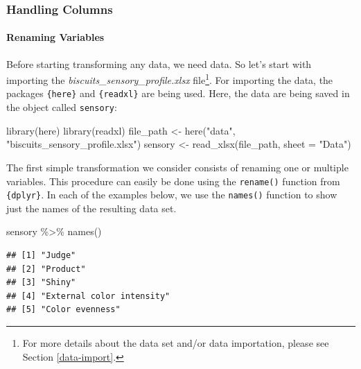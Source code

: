 \documentclass[
]{krantz}
\makeatletter
\newenvironment{Shaded}{\begin{snugshade}}{\end{snugshade}}
\newcommand{\AttributeTok}[1]{\textcolor[rgb]{0.61,0.61,0.61}{#1}}
\newcommand{\FunctionTok}[1]{\textcolor[rgb]{0,0,0}{#1}}
\newcommand{\NormalTok}[1]{#1}
\newcommand{\OtherTok}[1]{\textcolor[rgb]{0.37,0.37,0.37}{#1}}
\newcommand{\SpecialCharTok}[1]{\textcolor[rgb]{0,0,0}{#1}}
\newcommand{\StringTok}[1]{\textcolor[rgb]{0.5,0.5,0.5}{#1}}
\newenvironment{kframe}{%
\medskip{}
\setlength{\fboxsep}{.8em}
 \def\at@end@of@kframe{}%
 \ifinner\ifhmode%
  \def\at@end@of@kframe{\end{minipage}}%
  \begin{minipage}{\columnwidth}%
 \fi\fi%
 \def\FrameCommand##1{\hskip\@totalleftmargin \hskip-\fboxsep
 \colorbox{shadecolor}{##1}\hskip-\fboxsep
     \hskip-\linewidth \hskip-\@totalleftmargin \hskip\columnwidth}%
 \MakeFramed {\advance\hsize-\width
   \@totalleftmargin\z@ \linewidth\hsize
   \@setminipage}}%
 {\par\unskip\endMakeFramed%
 \at@end@of@kframe}
\renewenvironment{Shaded}{\begin{kframe}}{\end{kframe}}
\makeatother
\begin{document}
\hypertarget{handling-columns}{%
\subsubsection*{Handling Columns}\label{handling-columns}}


\hypertarget{renaming}{%
\paragraph*{Renaming Variables}\label{renaming}}

Before starting transforming any data, we need data. So let's start with importing the \emph{biscuits\_sensory\_profile.xlsx} file\footnote{For more details about the data set and/or data importation, please see Section \ref{data-import}.}. For importing the data, the packages \texttt{\{here\}} and \texttt{\{readxl\}} are being used. Here, the data are being saved in the object called \texttt{sensory}:

\begin{Shaded}
\begin{Highlighting}[]
\FunctionTok{library}\NormalTok{(here)}
\FunctionTok{library}\NormalTok{(readxl)}
\NormalTok{file\_path }\OtherTok{\textless{}{-}} \FunctionTok{here}\NormalTok{(}\StringTok{"data"}\NormalTok{, }\StringTok{"biscuits\_sensory\_profile.xlsx"}\NormalTok{)}
\NormalTok{sensory }\OtherTok{\textless{}{-}} \FunctionTok{read\_xlsx}\NormalTok{(file\_path, }\AttributeTok{sheet =} \StringTok{"Data"}\NormalTok{)}
\end{Highlighting}
\end{Shaded}

The first simple transformation we consider consists of renaming one or multiple variables. This procedure can easily be done using the \texttt{rename()} function from \texttt{\{dplyr\}}. In each of the examples below, we use the \texttt{names()} function to show just the names of the resulting data set.

\begin{Shaded}
\begin{Highlighting}[]
\NormalTok{sensory }\SpecialCharTok{\%\textgreater{}\%}
  \FunctionTok{names}\NormalTok{()}
\end{Highlighting}
\end{Shaded}

\begin{verbatim}
## [1] "Judge"                   
## [2] "Product"                 
## [3] "Shiny"                   
## [4] "External color intensity"
## [5] "Color evenness"
\end{verbatim}
\end{document}
